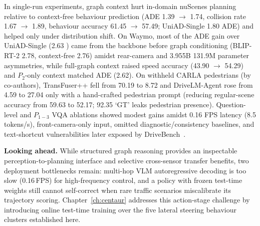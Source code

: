 In single-run experiments, graph context hurt in-domain nuScenes planning relative to context-free behaviour prediction (ADE 1.39 $\rightarrow$ 1.74, collision rate 1.67 $\rightarrow$ 1.89, behaviour accuracy 61.45 $\rightarrow$ 57.49; UniAD-Single 1.80 ADE) and helped only under distribution shift. On Waymo, most of the ADE gain over UniAD-Single (2.63 ) came from the backbone before graph conditioning (BLIP-RT-2 2.78, context-free 2.76) amidst rear-camera and 3.955B \vs 131.9M parameter asymmetries, while full-graph context raised speed accuracy (43.90 $\rightarrow$ 54.29) and $P_2$-only context matched ADE (2.62). On withheld CARLA pedestrians (by co-authors), TransFuser++ fell from 70.19 to 8.72 and DriveLM-Agent rose from 4.59 to 27.04 only with a hand-crafted pedestrian prompt (reducing regular-scene accuracy from 59.63 to 52.17; 92.35 `GT' leaks pedestrian presence). Question-level and $P_{1-3}$ VQA ablations showed modest gains amidst 0.16 FPS latency (8.5 tokens/s), front-camera-only input, omitted diagnostic/consistency baselines, and text-shortcut vulnerabilities later exposed by DriveBench~\cite{xie2025vlms}.

\textbf{Looking ahead.} While structured graph reasoning provides an inspectable perception-to-planning interface and selective cross-sensor transfer benefits, two deployment bottlenecks remain: multi-hop VLM autoregressive decoding is too slow (0.16\,FPS) for high-frequency control, and a policy with frozen test-time weights still cannot self-correct when rare traffic scenarios miscalibrate its trajectory scoring. Chapter~\ref{ch:centaur} addresses this action-stage challenge by introducing online test-time training over the five lateral steering behaviour clusters established here.
